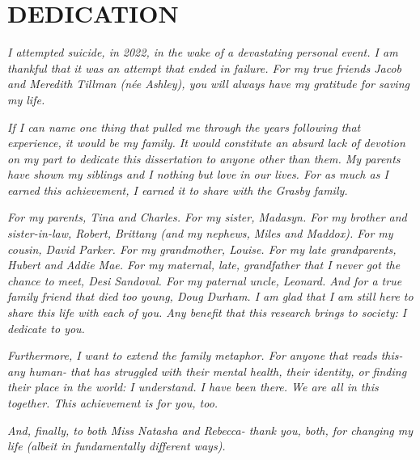 %
%
%
%  
%

\chapter*{DEDICATION}

\begin{center}
\vspace*{\fill}
\noindent \textit{I attempted suicide, in 2022, in the wake of a devastating personal event. I am thankful that it was an attempt that ended in failure. For my true friends Jacob and Meredith Tillman (née Ashley), you will always have my gratitude for saving my life.}

\vspace*{\fill}

\noindent \textit{If I can name one thing that pulled me through the years following that experience, it would be my family. It would constitute an absurd lack of devotion on my part to dedicate this dissertation to anyone other than them. My parents have shown my siblings and I nothing but love in our lives. For as much as I earned this achievement, I earned it to share with the Grasby family.}

\vspace*{\fill}

\noindent \textit{For my parents, Tina and Charles. For my sister, Madasyn. For my brother and sister-in-law, Robert, Brittany (and my nephews, Miles and Maddox). For my cousin, David Parker. For my grandmother, Louise. For my late grandparents, Hubert and Addie Mae. For my maternal, late, grandfather that I never got the chance to meet, Desi Sandoval. For my paternal uncle, Leonard. And for a true family friend that died too young, Doug Durham. I am glad that I am still here to share this life with each of you. Any benefit that this research brings to society: I dedicate to you.}

\vspace*{\fill}

\noindent \textit{Furthermore, I want to extend the family metaphor. For anyone that reads this- any human- that has struggled with their mental health, their identity, or finding their place in the world: I understand. I have been there. We are all in this together. This achievement is for you, too.}

\vspace*{\fill}

\noindent \textit{And, finally, to both Miss Natasha and Rebecca- thank you, both, for changing my life (albeit in fundamentally different ways).}
\end{center}

\pagebreak{}